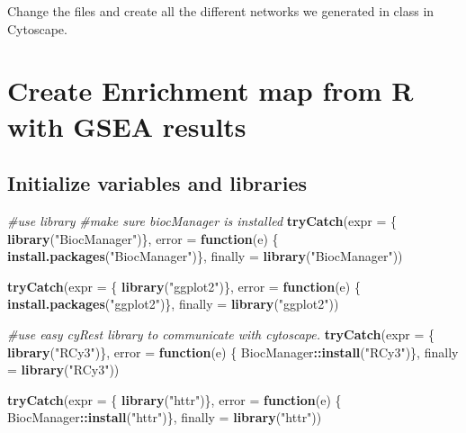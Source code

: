 \documentclass[
]{book}
\newenvironment{Shaded}{\begin{snugshade}}{\end{snugshade}}
\newcommand{\AttributeTok}[1]{\textcolor[rgb]{0.13,0.29,0.53}{#1}}
\newcommand{\CommentTok}[1]{\textcolor[rgb]{0.56,0.35,0.01}{\textit{#1}}}
\newcommand{\ControlFlowTok}[1]{\textcolor[rgb]{0.13,0.29,0.53}{\textbf{#1}}}
\newcommand{\FunctionTok}[1]{\textcolor[rgb]{0.13,0.29,0.53}{\textbf{#1}}}
\newcommand{\NormalTok}[1]{#1}
\newcommand{\SpecialCharTok}[1]{\textcolor[rgb]{0.81,0.36,0.00}{\textbf{#1}}}
\newcommand{\StringTok}[1]{\textcolor[rgb]{0.31,0.60,0.02}{#1}}
\begin{document}
Change the files and create all the different networks we generated in class in Cytoscape.

\hypertarget{create-enrichment-map-from-r-with-gsea-results}{%
\chapter{Create Enrichment map from R with GSEA results}\label{create-enrichment-map-from-r-with-gsea-results}}

\hypertarget{initialize-variables-and-libraries-2}{%
\section{Initialize variables and libraries}\label{initialize-variables-and-libraries-2}}

\begin{Shaded}
\begin{Highlighting}[]
\CommentTok{\#use library}
\CommentTok{\#make sure biocManager is installed}
\FunctionTok{tryCatch}\NormalTok{(}\AttributeTok{expr =}\NormalTok{ \{ }\FunctionTok{library}\NormalTok{(}\StringTok{"BiocManager"}\NormalTok{)\}, }
         \AttributeTok{error =} \ControlFlowTok{function}\NormalTok{(e) \{ }
           \FunctionTok{install.packages}\NormalTok{(}\StringTok{"BiocManager"}\NormalTok{)\}, }
         \AttributeTok{finally =} \FunctionTok{library}\NormalTok{(}\StringTok{"BiocManager"}\NormalTok{))}

\FunctionTok{tryCatch}\NormalTok{(}\AttributeTok{expr =}\NormalTok{ \{ }\FunctionTok{library}\NormalTok{(}\StringTok{"ggplot2"}\NormalTok{)\}, }
         \AttributeTok{error =} \ControlFlowTok{function}\NormalTok{(e) \{ }\FunctionTok{install.packages}\NormalTok{(}\StringTok{"ggplot2"}\NormalTok{)\}, }
         \AttributeTok{finally =} \FunctionTok{library}\NormalTok{(}\StringTok{"ggplot2"}\NormalTok{))}

\CommentTok{\#use easy cyRest library to communicate with cytoscape.}
\FunctionTok{tryCatch}\NormalTok{(}\AttributeTok{expr =}\NormalTok{ \{ }\FunctionTok{library}\NormalTok{(}\StringTok{"RCy3"}\NormalTok{)\}, }
         \AttributeTok{error =} \ControlFlowTok{function}\NormalTok{(e) \{ BiocManager}\SpecialCharTok{::}\FunctionTok{install}\NormalTok{(}\StringTok{"RCy3"}\NormalTok{)\}, }
         \AttributeTok{finally =} \FunctionTok{library}\NormalTok{(}\StringTok{"RCy3"}\NormalTok{))}

\FunctionTok{tryCatch}\NormalTok{(}\AttributeTok{expr =}\NormalTok{ \{ }\FunctionTok{library}\NormalTok{(}\StringTok{"httr"}\NormalTok{)\}, }
         \AttributeTok{error =} \ControlFlowTok{function}\NormalTok{(e) \{ BiocManager}\SpecialCharTok{::}\FunctionTok{install}\NormalTok{(}\StringTok{"httr"}\NormalTok{)\}, }
         \AttributeTok{finally =} \FunctionTok{library}\NormalTok{(}\StringTok{"httr"}\NormalTok{))}
\end{Highlighting}
\end{Shaded}
\end{document}
